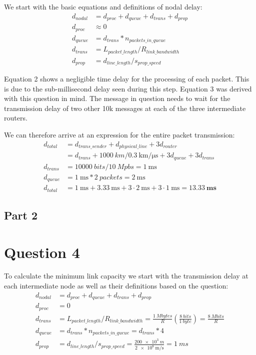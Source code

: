 \documentclass[12pt,letterpaper]{article}
\begin{document}
We start with the basic equations and definitions of nodal delay:
\begin{align}
d_{nodal} &= d_{proc} + d_{queue} + d_{trans} + d_{prop} \\
d_{proc} &\approx 0 \\
d_{queue} &= d_{trans} * n_{packets\_in\_queue} \\
d_{trans} &= L_{packet\_length} / R_{link\_bandwidth} \\
d_{prop} &= d_{line\_length} / s_{prop\_speed} 
\end{align}

Equation 2 shows a negligible time delay for the processing of each packet. This
is due to the sub-millisecond delay seen during this step.
Equation 3 was derived with this question in mind. The message in question needs
to wait for the transmission delay of two other 10k messages at each of the three
intermediate routers.

We can therefore arrive at an expression for the entire packet transmission:
\begin{align*}
d_{total} &= d_{trans\_sender} + d_{physical\_line} + 3d_{router} \\
&= d_{trans} + \SI{1000}{km}/\SI{0.3}{\km\per\us} + 3d_{queue} + 3d_{trans} \\
d_{trans} &= \SI{10000}{bits} / \SI{10}{Mpbs} = \SI{1}{\ms} \\
d_{queue} &= \SI{1}{\ms} * \SI{2}{packets} = \SI{2}{\ms} \\
d_{total} &= \SI{1}{\ms} + \SI{3.33}{\ms} + 3\cdot\SI{2}{\ms} + 3\cdot\SI{1}{\ms} = \pmb{\SI{13.33}{\ms}}
\end{align*}

\subsection*{Part 2}


\section*{Question 4}

To calculate the minimum link capacity we start with the transmission delay
at each intermediate node as well as their definitions based on the question:
\begin{align*}
d_{nodal} &= d_{proc} + d_{queue} + d_{trans} + d_{prop} \\
d_{proc} &= 0 \\
d_{trans} &= L_{packet\_length} / R_{link\_bandwidth} = \frac{\SI{1}{Mbytes}}{R}(\frac{\SI{8}{bits}}{\SI{1}{byte}}) = \frac{\SI{8}{Mbits}}{R} \\
d_{queue} &= d_{trans} * n_{packets\_in\_queue} = d_{trans} * 4 \\
d_{prop} &= d_{line\_length} / s_{prop\_speed} = \frac{\SI{200e3}{m}}{\SI{2e8}{\m/\s}} = \SI{1}{ms}
\end{align*}
\end{document}
